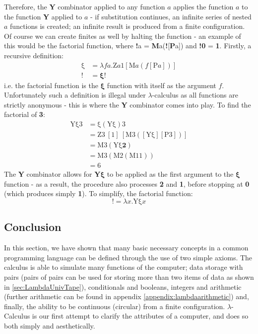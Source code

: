 \documentclass[Master.tex]{subfiles}
\begin{document}
Therefore, the \textbf{Y} combinator applied to any function $a$ applies the function $a$ to the function \textbf{Y} applied to $a$ - if substitution continues, an infinite series of nested $a$ functions is created; an infinite result is produced from a finite configuration. Of course we can create finites as well by halting the function - an example of this would be the factorial function, where \textbf{!}a = \textbf{M}a(\textbf{!}[\textbf{P}a]) and \textbf{!0} = \textbf{1}. Firstly, a recursive definition:
\begin{equation*}
\begin{aligned}
\bm{\mathrm{\xi}} &= \lambda fa.\bm{\mathrm{Z}}a\bm{\mathrm{1}}[\bm{\mathrm{M}}a(f[\bm{\mathrm{P}}a])]\\
\bm{!} &= \bm{\xi}\bm{!}
\end{aligned}
\end{equation*}
i.e. the factorial function is the $\bm{\xi}$ function with itself as the argument $f$. Unfortunately such a definition is illegal under $\lambda$-calculus as all functions are strictly anonymous - this is where the \textbf{Y} combinator comes into play. To find the factorial of \textbf{3}:
\begin{equation*}
\begin{aligned}
\bm{\mathrm{Y\xi 3}} &= \bm{\mathrm{\xi}}(\bm{\mathrm{Y\xi}})\bm{\mathrm{3}}\\
&= \bm{\mathrm{Z3}}\ [\bm{\mathrm{1}}]\ [\bm{\mathrm{M3}}([\bm{\mathrm{Y\xi}}][\bm{\mathrm{P3}}])]\\
&= \bm{\mathrm{M3}}(\bm{\mathrm{Y\xi}}\bm{2})\\
&= \bm{\mathrm{M3}}(\bm{\mathrm{M2}}(\bm{\mathrm{M11}}))\\
&= \bm{\mathrm{6}}
\end{aligned}
\end{equation*}
The \textbf{Y} combinator allows for \textbf{Y}$\bm{\xi}$ to be applied as the first argument to the $\bm{\xi}$ function - as a result, the procedure also processes \textbf{2} and \textbf{1}, before stopping at \textbf{0} (which produces simply \textbf{1}). To simplify, the factorial function:
\begin{equation*}
\bm{!} = \lambda x.\bm{\mathrm{Y\xi}}x
\end{equation*}
\subsection{Conclusion}

In this section, we have shown that many basic necessary concepts in a common programming language can be defined through the use of two simple axioms. The calculus is able to simulate many functions of the computer; data storage with pairs (pairs of pairs can be used for storing more than two items of data as shown in \cref{sec:LambdaUnivTape}), conditionals and booleans, integers and arithmetic (further arithmetic can be found in appendix \ref{appendix:lambdaarithmetic}) and, finally, the ability to be continuous (circular) from a finite configuration. $\lambda$-Calculus is our first attempt to clarify the attributes of a computer, and does so both simply and aesthetically.
\end{document}
